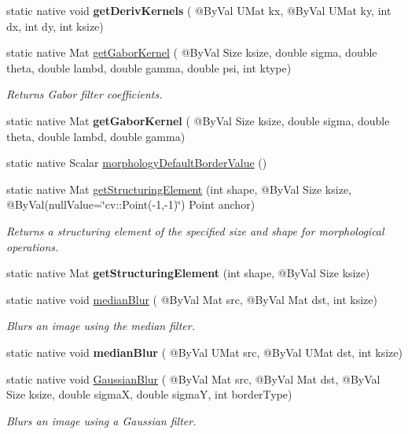\begin{DoxyCompactItemize}
\item 
static native void {\bfseries get\+Deriv\+Kernels} ( @By\+Val U\+Mat kx, @By\+Val U\+Mat ky, int dx, int dy, int ksize)
\item 
static native Mat \hyperlink{group__imgproc__filter_ga8c30992daccc2467cea3d7d2f016a9ab}{get\+Gabor\+Kernel} ( @By\+Val Size ksize, double sigma, double theta, double lambd, double gamma, double psi, int ktype)
\begin{DoxyCompactList}\small\item\em Returns Gabor filter coefficients. \end{DoxyCompactList}\item 
static native Mat {\bfseries get\+Gabor\+Kernel} ( @By\+Val Size ksize, double sigma, double theta, double lambd, double gamma)
\item 
static native Scalar \hyperlink{group__imgproc__filter_gaa77a7ec53d115ff76de4c8797d6d83f7}{morphology\+Default\+Border\+Value} ()
\item 
static native Mat \hyperlink{group__imgproc__filter_ga18af407581ba537b9095d14090cce31a}{get\+Structuring\+Element} (int shape, @By\+Val Size ksize, @By\+Val(null\+Value=\char`\"{}cv\+::\+Point(-\/1,-\/1)\char`\"{}) Point anchor)
\begin{DoxyCompactList}\small\item\em Returns a structuring element of the specified size and shape for morphological operations. \end{DoxyCompactList}\item 
static native Mat {\bfseries get\+Structuring\+Element} (int shape, @By\+Val Size ksize)
\item 
static native void \hyperlink{group__imgproc__filter_ga6a7fd362c0b073cd051d4fcb7a9904c9}{median\+Blur} ( @By\+Val Mat src, @By\+Val Mat dst, int ksize)
\begin{DoxyCompactList}\small\item\em Blurs an image using the median filter. \end{DoxyCompactList}\item 
static native void {\bfseries median\+Blur} ( @By\+Val U\+Mat src, @By\+Val U\+Mat dst, int ksize)
\item 
static native void \hyperlink{group__imgproc__filter_gaf8f0c37e9b9c420a8edfc2753c8fe966}{Gaussian\+Blur} ( @By\+Val Mat src, @By\+Val Mat dst, @By\+Val Size ksize, double sigmaX, double sigmaY, int border\+Type)
\begin{DoxyCompactList}\small\item\em Blurs an image using a Gaussian filter. \end{DoxyCompactList}\item 

\end{DoxyCompactItemize}
